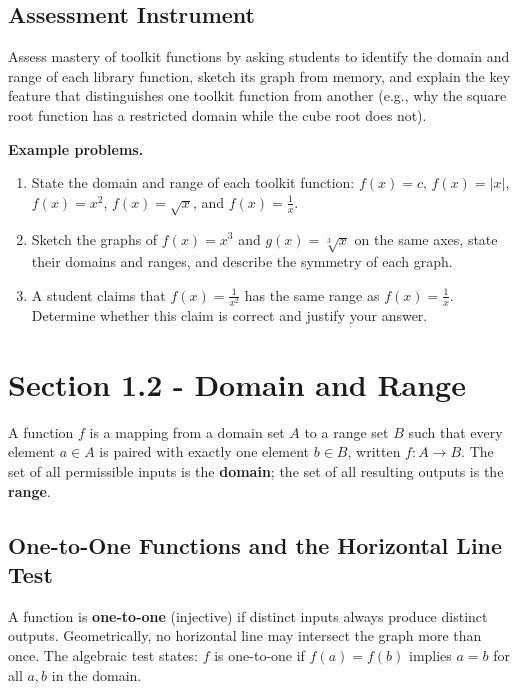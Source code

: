 \subsection{Assessment Instrument}
\label{ssec:asse-3669}

Assess mastery of toolkit functions by asking students to identify the domain and range of
each library function, sketch its graph from memory, and explain the key feature that
distinguishes one toolkit function from another (e.g., why the square root function has a
restricted domain while the cube root does not).

\textbf{Example problems.}
\begin{enumerate}
    \item State the domain and range of each toolkit function: $f(x) = c$, $f(x) = |x|$, $f(x) = x^{2}$, $f(x) = \sqrt{x}$, and $f(x) = \frac{1}{x}$.
    \item Sketch the graphs of $f(x) = x^{3}$ and $g(x) = \sqrt[3]{x}$ on the same axes, state their domains and ranges, and describe the symmetry of each graph.
    \item A student claims that $f(x) = \frac{1}{x^{2}}$ has the same range as $f(x) = \frac{1}{x}$. Determine whether this claim is correct and justify your answer.
\end{enumerate}

\section{Section 1.2 - Domain and Range}
\label{sec:sect-5062}

A function $f$ is a mapping from a domain set $A$ to a range set $B$ such that
every element $a \in A$ is paired with exactly one element $b \in B$, written
$f : A \to B$.  The set of all permissible inputs is the \textbf{domain}; the
set of all resulting outputs is the \textbf{range}.

\subsection*{One-to-One Functions and the Horizontal Line Test}

A function is \textbf{one-to-one} (injective) if distinct inputs always
produce distinct outputs.  Geometrically, no horizontal line may intersect
the graph more than once.  The algebraic test states: $f$ is one-to-one if
$f(a) = f(b)$ implies $a = b$ for all $a, b$ in the domain.

